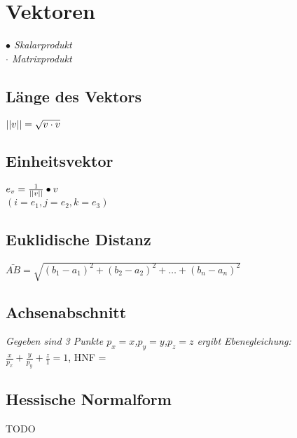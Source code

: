 \section{Vektoren}

\textit{$\bullet$ Skalarprodukt} \\
\textit{$\cdot$ Matrixprodukt}

\subsection{Länge des Vektors}
$ \lvert\lvert v \rvert\rvert = \sqrt{v \cdot v} $

\subsection{Einheitsvektor}

$ e_v = \frac{1}{\lvert\lvert v \rvert\rvert} \bullet v $ \\
$ ( i = e_1, j = e_2, k = e_3 ) $

\subsection{Euklidische Distanz}

$\bar{AB} = \sqrt{(b_1-a_1)^2 + (b_2 - a_2)^2 + \dots + (b_n - a_n)^2}$

\subsection{Achsenabschnitt}

\textit{Gegeben sind 3 Punkte $p_x = x$,$p_y = y$,$p_z = z$ ergibt Ebenegleichung:} \\

$\frac{x}{p_x} + \frac{y}{p_y} + \frac{z}{1} = 1$,
HNF = $\frac{}{}$

\subsection{Hessische Normalform}

TODO